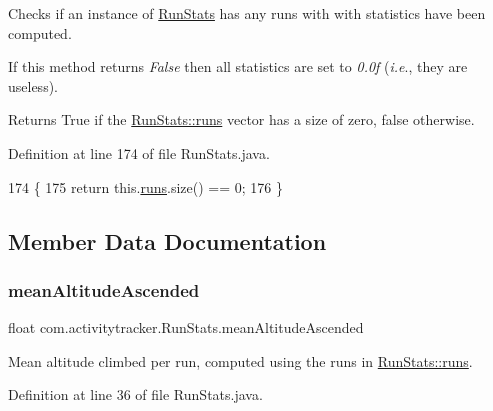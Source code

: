 Checks if an instance of \mbox{\hyperlink{classcom_1_1activitytracker_1_1_run_stats}{Run\+Stats}} has any runs with with statistics have been computed.

If this method returns {\itshape False} then all statistics are set to {\itshape 0.\+0f} ({\itshape i.\+e}., they are useless).

\begin{DoxyReturn}{Returns}
True if the \mbox{\hyperlink{classcom_1_1activitytracker_1_1_run_stats_a0fd429e9f463ddf4897c507c0e3c0a12}{Run\+Stats\+::runs}} vector has a size of zero, false otherwise. 
\end{DoxyReturn}


Definition at line 174 of file Run\+Stats.\+java.


\begin{DoxyCode}
174                              \{
175         \textcolor{keywordflow}{return} this.\mbox{\hyperlink{classcom_1_1activitytracker_1_1_run_stats_a0fd429e9f463ddf4897c507c0e3c0a12}{runs}}.size() == 0;
176     \}
\end{DoxyCode}


\subsection{Member Data Documentation}
\mbox{\label{classcom_1_1activitytracker_1_1_run_stats_aecbe62c15075fe9be1604333c355fab6}} 
\subsubsection{\texorpdfstring{mean\+Altitude\+Ascended}{meanAltitudeAscended}}
{\footnotesize\ttfamily float com.\+activitytracker.\+Run\+Stats.\+mean\+Altitude\+Ascended\hspace{0.3cm}{\ttfamily [private]}}

Mean altitude climbed per run, computed using the runs in \mbox{\hyperlink{classcom_1_1activitytracker_1_1_run_stats_a0fd429e9f463ddf4897c507c0e3c0a12}{Run\+Stats\+::runs}}. 

Definition at line 36 of file Run\+Stats.\+java.

\mbox{\label{classcom_1_1activitytracker_1_1_run_stats_a578eae64367a00c625f4685fe879fe7c}} 
